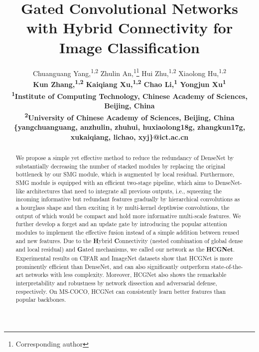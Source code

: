\documentclass[letterpaper]{article}
\title{Gated Convolutional Networks with Hybrid Connectivity for Image Classification}
\author{Chuanguang Yang,\textsuperscript{\rm 1,2} Zhulin An,\textsuperscript{\rm 1}\thanks{Corresponding author} Hui Zhu,\textsuperscript{\rm 1,2} Xiaolong Hu,\textsuperscript{\rm 1,2}  \\ \bf \Large{Kun Zhang,\textsuperscript{\rm 1,2} Kaiqiang Xu,\textsuperscript{\rm 1,2} Chao Li,\textsuperscript{\rm 1} Yongjun Xu\textsuperscript{\rm 1}}\\ 
\textsuperscript{\rm 1}Institute of Computing Technology, Chinese Academy of Sciences, Beijing, China\\ 
\textsuperscript{\rm 2}University of Chinese Academy of Sciences, Beijing, China\\
\{yangchuanguang, anzhulin, zhuhui, huxiaolong18g, zhangkun17g, xukaiqiang, lichao, xyj\}@ict.ac.cn 
}
\begin{document}
 	
 	\maketitle
 	
 	\begin{abstract}
 		We propose a simple yet effective method to reduce the redundancy of DenseNet by substantially decreasing the number of stacked modules by replacing the original bottleneck by our SMG module, which is augmented by local residual. Furthermore, SMG module is equipped with an efficient two-stage pipeline, which aims to DenseNet-like architectures that need to integrate all previous outputs, i.e., squeezing the incoming informative but redundant features gradually by hierarchical convolutions as a hourglass shape and then exciting it by multi-kernel depthwise convolutions, the output of which would be compact and hold more informative multi-scale features. We further develop a forget and an update gate by introducing the popular attention modules to implement the effective fusion instead of a simple addition between reused and new features.  Due to the \textbf{H}ybrid \textbf{C}onnectivity (nested combination of global dense and local residual) and \textbf{G}ated mechanisms, we called our network as the \textbf{HCGNet}. Experimental results on CIFAR and ImageNet datasets show that HCGNet is more prominently efficient than DenseNet, and can also significantly outperform state-of-the-art networks with less complexity. Moreover, HCGNet also shows the remarkable interpretability and robustness by network dissection and adversarial defense, respectively. On MS-COCO, HCGNet can consistently learn better features than popular backbones.
 	\end{abstract}
\end{document}
